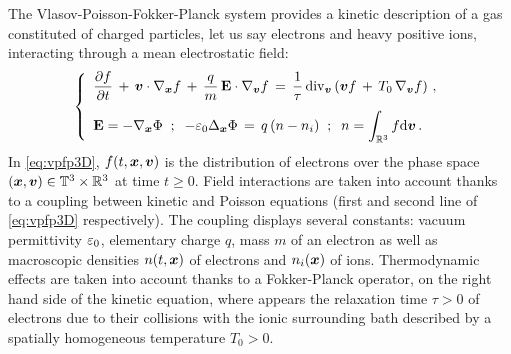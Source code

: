 \documentclass[11pt]{amsart}
\numberwithin{equation}{section}
\numberwithin{figure}{section}
\begin{document}
The
Vlasov-Poisson-Fokker-Planck system provides a kinetic description of a gas constituted of
  charged particles, let us say electrons and heavy positive ions,   interacting through a mean electrostatic field:
\begin{equation}
    \label{eq:vpfp3D}
  \left\{
    \begin{array}{l}
\displaystyle\frac{\partial f}{\partial t}\,+\,{\bm v}\cdot\nabla_{\bm x} f
      \,+\, \frac{q}{m}\,{\mathbf E}\cdot\nabla_{\bm v} f \,=\,
      \frac{1}{\tau}\,{\rm div}_{\bm v}\left({\bm v} f \,+\, T_0 \,\nabla_{\bm v} f \right)\,,
      \\[1.1em]
      \displaystyle{\mathbf E} = -\nabla_{\bm x} \Phi\;\;;\;\;-\varepsilon_0\Delta_{{\bm x}}\Phi \,=\, q\,(n- n_i)\;\;;\;\; n =\int_{{\mathbb R}^3} f \mathrm{d} {\bm v} \,.
      \end{array}\right.
  \end{equation}
  In \eqref{eq:vpfp3D}, $f(t,{\bm x},{\bm v})$ is the distribution of electrons over the phase space $({\bm x},{\bm v})\in{\mathbb T}^3\times{\mathbb R}^3$ at time $t\geq0$. Field interactions are taken into account thanks to a coupling between kinetic and Poisson equations (first and second line of \eqref{eq:vpfp3D} respectively). The coupling displays several constants: vacuum permittivity $\varepsilon_0$, elementary charge $q$, mass $m$ of an electron as well as macroscopic densities $n(t,{\bm x})$ of electrons and $n_i({\bm x})$ of ions. Thermodynamic effects are taken into account thanks to a Fokker-Planck operator, on the right hand side of the kinetic equation, where appears the
  relaxation time $\tau>0$ of electrons due to their collisions with the ionic surrounding bath described by a spatially homogeneous  temperature $T_0>0$.
\end{document}
